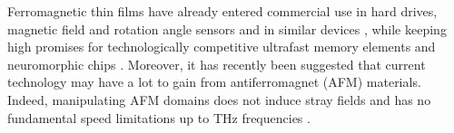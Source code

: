 Ferromagnetic thin films have already entered commercial use in hard drives, magnetic field and rotation angle sensors and in similar devices  \cite{Parkin2003,Jogschies2015,Novoselov2019}, while keeping high promises for technologically competitive ultrafast memory elements \cite{Lau2016} and neuromorphic chips \cite{Fukami2016}. 
Moreover, it has recently been suggested that current technology may have a lot to gain from antiferromagnet (AFM) materials. Indeed, manipulating AFM domains does not induce stray fields and has no fundamental speed limitations up to THz frequencies \cite{Jungwirth2016AFMreview}. 


